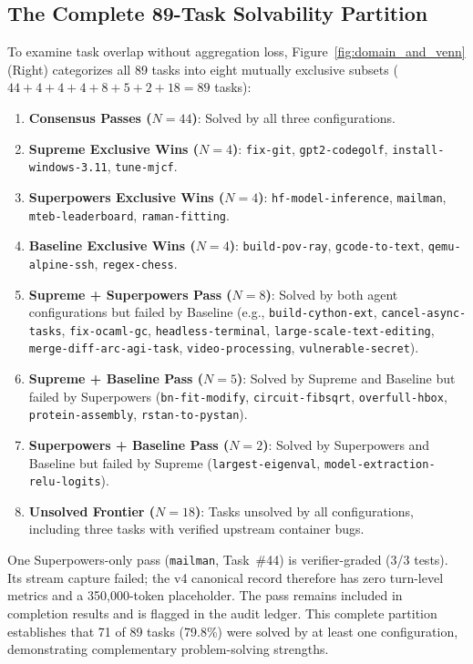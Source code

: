 \subsection{The Complete 89-Task Solvability Partition}
To examine task overlap without aggregation loss, Figure~\ref{fig:domain_and_venn} (Right) categorizes all 89 tasks into eight mutually exclusive subsets ($44 + 4 + 4 + 4 + 8 + 5 + 2 + 18 = 89$ tasks):
\begin{enumerate}
    \item \textbf{Consensus Passes ($N=44$)}: Solved by all three configurations.
    \item \textbf{Supreme Exclusive Wins ($N=4$)}: \texttt{fix-git}, \texttt{gpt2-codegolf}, \texttt{install-windows-3.11}, \texttt{tune-mjcf}.
    \item \textbf{Superpowers Exclusive Wins ($N=4$)}: \texttt{hf-model-inference}, \texttt{mailman}, \texttt{mteb-leaderboard}, \texttt{raman-fitting}.
    \item \textbf{Baseline Exclusive Wins ($N=4$)}: \texttt{build-pov-ray}, \texttt{gcode-to-text}, \texttt{qemu-alpine-ssh}, \texttt{regex-chess}.
    \item \textbf{Supreme + Superpowers Pass ($N=8$)}: Solved by both agent configurations but failed by Baseline (e.g., \texttt{build-cython-ext}, \texttt{cancel-async-tasks}, \texttt{fix-ocaml-gc}, \texttt{headless-terminal}, \texttt{large-scale-text-editing}, \texttt{merge-diff-arc-agi-task}, \texttt{video-processing}, \texttt{vulnerable-secret}).
    \item \textbf{Supreme + Baseline Pass ($N=5$)}: Solved by Supreme and Baseline but failed by Superpowers (\texttt{bn-fit-modify}, \texttt{circuit-fibsqrt}, \texttt{overfull-hbox}, \texttt{protein-assembly}, \texttt{rstan-to-pystan}).
    \item \textbf{Superpowers + Baseline Pass ($N=2$)}: Solved by Superpowers and Baseline but failed by Supreme (\texttt{largest-eigenval}, \texttt{model-extraction-relu-logits}).
    \item \textbf{Unsolved Frontier ($N=18$)}: Tasks unsolved by all configurations, including three tasks with verified upstream container bugs.
\end{enumerate}
One Superpowers-only pass (\texttt{mailman}, Task~\#44) is verifier-graded (3/3 tests). Its stream capture failed; the v4 canonical record therefore has zero turn-level metrics and a 350,000-token placeholder. The pass remains included in completion results and is flagged in the audit ledger.
This complete partition establishes that 71 of 89 tasks (79.8\%) were solved by at least one configuration, demonstrating complementary problem-solving strengths.
